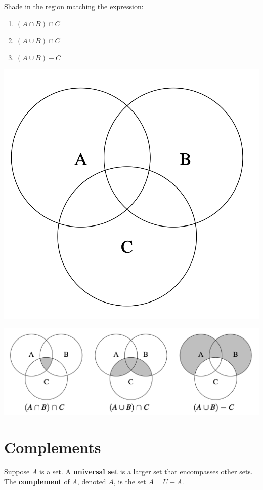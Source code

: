 \documentclass[
  letterpaper,
  DIV=11,
  numbers=noendperiod]{scrreprt}
\providecommand{\tightlist}{%
  \setlength{\itemsep}{0pt}\setlength{\parskip}{0pt}}\usepackage{longtable,booktabs,array}
\begin{document}
Shade in the region matching the expression:

\begin{enumerate}
\def\labelenumi{\arabic{enumi}.}
\tightlist
\item
  \((A \cap B) \cap C\)
\item
  \((A \cup B) \cap C\)
\item
  \((A \cup B) - C\)
\end{enumerate}

\includegraphics[width=0.35\linewidth,height=\textheight,keepaspectratio]{lecture2/images/union-intersection-complement-ex.png}

\begin{tcolorbox}[enhanced jigsaw, opacityback=0, left=2mm, breakable, bottomtitle=1mm, rightrule=.15mm, colframe=quarto-callout-tip-color-frame, titlerule=0mm, colback=white, opacitybacktitle=0.6, toptitle=1mm, title=\textcolor{quarto-callout-tip-color}{\faLightbulb}\hspace{0.5em}{Solution}, colbacktitle=quarto-callout-tip-color!10!white, bottomrule=.15mm, arc=.35mm, coltitle=black, leftrule=.75mm, toprule=.15mm]

\includegraphics[width=0.75\linewidth,height=\textheight,keepaspectratio]{lecture2/images/union-intersection-complement-ans.png}

\end{tcolorbox}

\section{Complements}\label{complements}

Suppose \(A\) is a set. A \textbf{universal set} is a larger set that
encompasses other sets. The \textbf{complement} of \(A\), denoted
\(\bar{A}\), is the set \(\bar{A} = U - A\).
\end{document}
